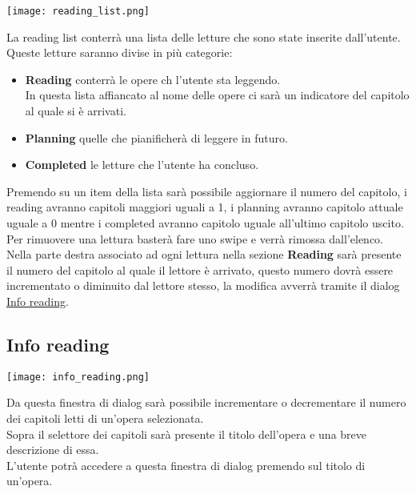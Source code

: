 \documentclass[../Assignment-3-LPSMT.tex]{subfiles}
\begin{document}
\begin{center}
   \texttt{[image: reading\_list.png]}
\end{center}

La reading list conterrà una lista delle letture che sono state inserite dall'utente.\\
Queste letture saranno divise in più categorie:
\begin{itemize}
   \item \textbf{Reading} conterrà le opere ch l'utente sta leggendo.\\
   In questa lista affiancato al nome delle opere ci sarà un indicatore del capitolo al quale si è arrivati.
   \item \textbf{Planning} quelle che pianificherà di leggere in futuro.
   \item \textbf{Completed} le letture che l'utente ha concluso.
\end{itemize}
Premendo su un item della lista sarà possibile aggiornare il numero del capitolo, i reading avranno capitoli maggiori uguali a 1, i planning avranno capitolo attuale uguale a 0 mentre i completed avranno capitolo uguale all'ultimo capitolo uscito.\\
Per rimuovere una lettura basterà fare uno swipe e verrà rimossa dall'elenco.\\
Nella parte destra associato ad ogni lettura nella sezione \textbf{Reading} sarà presente il numero del capitolo al quale il lettore è arrivato, questo numero dovrà essere incrementato o diminuito dal lettore stesso, la modifica avverrà tramite il dialog \hyperref[sec:info_reading]{Info reading}.

\subsection{Info reading}\label{sec:info_reading}

\begin{center}
   \texttt{[image: info\_reading.png]}
\end{center}

Da questa finestra di dialog sarà possibile incrementare o decrementare il numero dei capitoli letti di un'opera selezionata.\\
Sopra il selettore dei capitoli sarà presente il titolo dell'opera e una breve descrizione di essa.\\
L'utente potrà accedere a questa finestra di dialog premendo sul titolo di un'opera.\\
\end{document}
